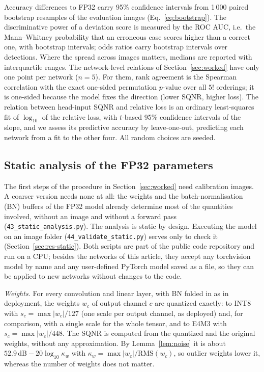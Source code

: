 \documentclass[pdflatex,sn-mathphys-num]{sn-jnl}%
\theoremstyle{thmstyleone}%
\theoremstyle{thmstyletwo}%
\theoremstyle{thmstylethree}%
\begin{document}
Accuracy differences to FP32 carry 95\% confidence intervals from 1\,000 paired bootstrap resamples of the evaluation images (Eq.~\eqref{eq:bootstrap}). The discriminative power of a deviation score is measured by the ROC AUC, i.e.\ the Mann--Whitney probability that an erroneous case scores higher than a correct one, with bootstrap intervals; odds ratios carry bootstrap intervals over detections. Where the spread across images matters, medians are reported with interquartile ranges. The network-level relations of Section~\ref{sec:worked} have only one point per network ($n=5$). For them, rank agreement is the Spearman correlation with the exact one-sided permutation $p$-value over all $5!$ orderings; it is one-sided because the model fixes the direction (lower SQNR, higher loss). The relation between head-input SQNR and relative loss is an ordinary least-squares fit of $\log_{10}$ of the relative loss, with $t$-based 95\% confidence intervals of the slope, and we assess its predictive accuracy by leave-one-out, predicting each network from a fit to the other four. All random choices are seeded.

\subsection{Static analysis of the FP32 parameters}\label{sec:static}
The first steps of the procedure in Section~\ref{sec:worked} need calibration images. A coarser version needs none at all: the weights and the batch-normalisation (BN) buffers of the FP32 model already determine most of the quantities involved, without an image and without a forward pass (\texttt{43\_static\_analysis.py}). The analysis is static by design. Executing the model on an image folder (\texttt{44\_validate\_static.py}) serves only to check it (Section~\ref{sec:res-static}). Both scripts are part of the public code repository and run on a CPU; besides the networks of this article, they accept any torchvision model by name and any user-defined PyTorch model saved as a file, so they can be applied to new networks without changes to the code.

\emph{Weights.} For every convolution and linear layer, with BN folded in as in deployment, the weights $w_c$ of output channel $c$ are quantized exactly: to INT8 with $s_c=\max|w_c|/127$ (one scale per output channel, as deployed) and, for comparison, with a single scale for the whole tensor, and to E4M3 with $s_c=\max|w_c|/448$. The SQNR is computed from the quantized and the original weights, without any approximation. By Lemma~\ref{lem:noise} it is about $52.9\,\mathrm{dB}-20\log_{10}\kappa_w$ with $\kappa_w=\max|w_c|/\mathrm{RMS}(w_c)$, so outlier weights lower it, whereas the number of weights does not matter.
\end{document}
